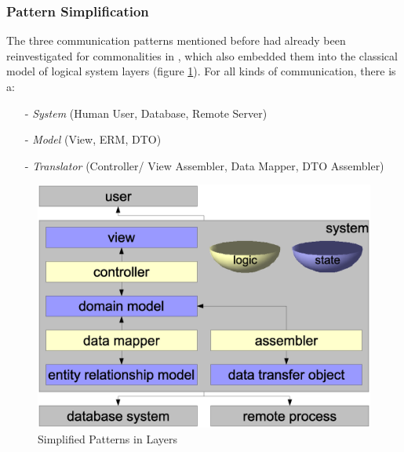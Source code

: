 %
%
%
%
%
%
%

\subsubsection{Pattern Simplification}
\label{pattern_simplification_heading}

The three communication patterns mentioned before had already been
reinvestigated for commonalities in \cite{hellerkunze}, which also embedded
them into the classical model of logical system layers (figure
\ref{simplification_figure}). For all kinds of communication, there is a:

\begin{itemize}
    \item[-] \emph{System} (Human User, Database, Remote Server)
    \item[-] \emph{Model} (View, ERM, DTO)
    \item[-] \emph{Translator} (Controller/ View Assembler, Data Mapper, DTO Assembler)
\end{itemize}

\begin{figure}[ht]
    \begin{center}
        \includegraphics[scale=0.2]{vector/simplification.eps}
        \caption{Simplified Patterns in Layers}
        \label{simplification_figure}
    \end{center}
\end{figure}

